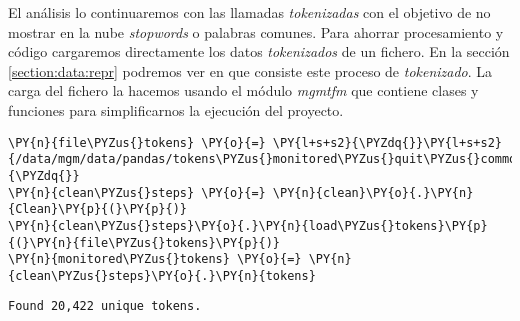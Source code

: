  El análisis lo continuaremos con las llamadas \textit{tokenizadas} con el objetivo de no mostrar en la nube \textit{stopwords} o palabras comunes. Para ahorrar procesamiento y código cargaremos directamente los datos \textit{tokenizados} de un fichero. En la sección \ref{section:data:repr} podremos ver en que consiste este proceso de \textit{tokenizado}. La carga del fichero la hacemos usando el módulo \textit{mgmtfm}
que contiene clases y funciones para simplificarnos la ejecución del
proyecto.

\vspace{0.5cm}

    \begin{tcolorbox}[breakable, size=fbox, boxrule=1pt, pad at break*=1mm,colback=cellbackground, colframe=cellborder]
\begin{Verbatim}[commandchars=\\\{\}]
\PY{n}{file\PYZus{}tokens} \PY{o}{=} \PY{l+s+s2}{\PYZdq{}}\PY{l+s+s2}{/data/mgm/data/pandas/tokens\PYZus{}monitored\PYZus{}quit\PYZus{}commons\PYZus{}12112019.pkl}\PY{l+s+s2}{\PYZdq{}}
\PY{n}{clean\PYZus{}steps} \PY{o}{=} \PY{n}{clean}\PY{o}{.}\PY{n}{Clean}\PY{p}{(}\PY{p}{)}
\PY{n}{clean\PYZus{}steps}\PY{o}{.}\PY{n}{load\PYZus{}tokens}\PY{p}{(}\PY{n}{file\PYZus{}tokens}\PY{p}{)}
\PY{n}{monitored\PYZus{}tokens} \PY{o}{=} \PY{n}{clean\PYZus{}steps}\PY{o}{.}\PY{n}{tokens}
\end{Verbatim}
\end{tcolorbox}

    \begin{Verbatim}[commandchars=\\\{\}]
Found 20,422 unique tokens.
    \end{Verbatim}

